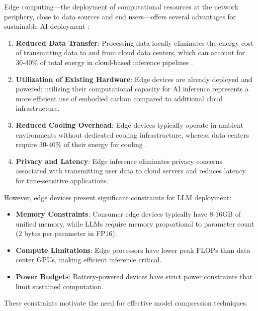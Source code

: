 \documentclass[11pt,a4paper]{article}
\begin{document}
Edge computing—the deployment of computational resources at the network periphery, close to data sources and end users—offers several advantages for sustainable AI deployment \cite{shi2016edge}:

\begin{enumerate}[leftmargin=*,nosep]
    \item \textbf{Reduced Data Transfer}: Processing data locally eliminates the energy cost of transmitting data to and from cloud data centers, which can account for 30-40\% of total energy in cloud-based inference pipelines \cite{masanet2020recalibrating}.
    
    \item \textbf{Utilization of Existing Hardware}: Edge devices are already deployed and powered; utilizing their computational capacity for AI inference represents a more efficient use of embodied carbon compared to additional cloud infrastructure.
    
    \item \textbf{Reduced Cooling Overhead}: Edge devices typically operate in ambient environments without dedicated cooling infrastructure, whereas data centers require 30-40\% of their energy for cooling \cite{avgerinou2017towards}.
    
    \item \textbf{Privacy and Latency}: Edge inference eliminates privacy concerns associated with transmitting user data to cloud servers and reduces latency for time-sensitive applications.
\end{enumerate}

However, edge devices present significant constraints for LLM deployment:

\begin{itemize}[leftmargin=*,nosep]
    \item \textbf{Memory Constraints}: Consumer edge devices typically have 8-16GB of unified memory, while LLMs require memory proportional to parameter count (2 bytes per parameter in FP16).
    
    \item \textbf{Compute Limitations}: Edge processors have lower peak FLOPs than data center GPUs, making efficient inference critical.
    
    \item \textbf{Power Budgets}: Battery-powered devices have strict power constraints that limit sustained computation.
\end{itemize}

These constraints motivate the need for effective model compression techniques.
\end{document}
